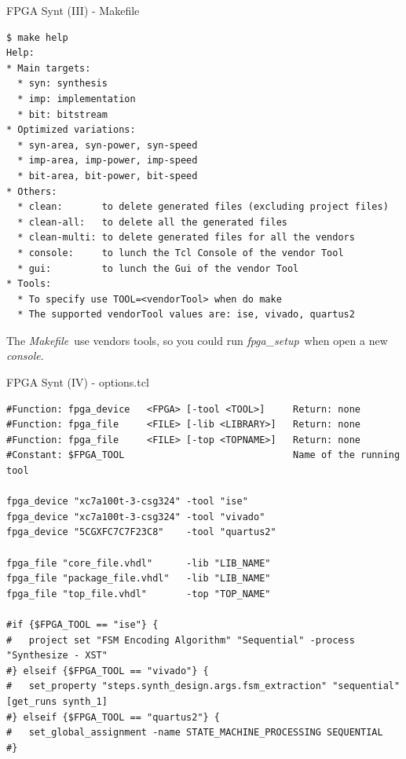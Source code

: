 \documentclass{beamer}
\newcommand{\fpgasetup}      {\textit{fpga\_setup}}
\newcommand{\console}        {\textit{console}}
\newcommand{\makefile}       {\textit{Makefile}}
\begin{document}
\begin{frame}[fragile]{FPGA Synt (III) - Makefile}
  \tiny
  \begin{verbatim}
$ make help 
Help:
* Main targets:
  * syn: synthesis
  * imp: implementation
  * bit: bitstream
* Optimized variations:
  * syn-area, syn-power, syn-speed
  * imp-area, imp-power, imp-speed
  * bit-area, bit-power, bit-speed
* Others:
  * clean:       to delete generated files (excluding project files)
  * clean-all:   to delete all the generated files
  * clean-multi: to delete generated files for all the vendors
  * console:     to lunch the Tcl Console of the vendor Tool
  * gui:         to lunch the Gui of the vendor Tool
* Tools:
  * To specify use TOOL=<vendorTool> when do make
  * The supported vendorTool values are: ise, vivado, quartus2
  \end{verbatim}
  \begin{alertblock}{}
    \small
    The \makefile\ use vendors tools, so you could run \fpgasetup\ when open
    a new \console.
  \end{alertblock}
\end{frame}

\begin{frame}[fragile]{FPGA Synt (IV) - options.tcl}
  \tiny
  \begin{verbatim}
#Function: fpga_device   <FPGA> [-tool <TOOL>]     Return: none
#Function: fpga_file     <FILE> [-lib <LIBRARY>]   Return: none
#Function: fpga_file     <FILE> [-top <TOPNAME>]   Return: none
#Constant: $FPGA_TOOL                              Name of the running tool

fpga_device "xc7a100t-3-csg324" -tool "ise"
fpga_device "xc7a100t-3-csg324" -tool "vivado"
fpga_device "5CGXFC7C7F23C8"    -tool "quartus2"

fpga_file "core_file.vhdl"      -lib "LIB_NAME"
fpga_file "package_file.vhdl"   -lib "LIB_NAME"
fpga_file "top_file.vhdl"       -top "TOP_NAME"

#if {$FPGA_TOOL == "ise"} {
#   project set "FSM Encoding Algorithm" "Sequential" -process "Synthesize - XST"
#} elseif {$FPGA_TOOL == "vivado"} {
#   set_property "steps.synth_design.args.fsm_extraction" "sequential" [get_runs synth_1]
#} elseif {$FPGA_TOOL == "quartus2"} {
#   set_global_assignment -name STATE_MACHINE_PROCESSING SEQUENTIAL
#}
  \end{verbatim}
\end{frame}
\end{document}
